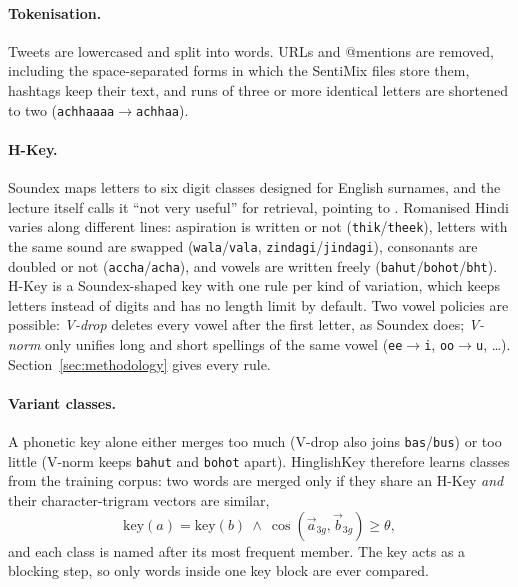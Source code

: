 \paragraph{Tokenisation.} Tweets are lowercased and split into words. URLs and @mentions are
removed, including the space-separated forms in which the SentiMix files store them, hashtags keep
their text, and runs of three or more identical letters are shortened to two
(\texttt{achhaaaa}$\to$\texttt{achhaa}).

\paragraph{H-Key.} Soundex \citep[Section~3.4]{manning2008iir} maps letters to six digit classes
designed for English surnames, and the lecture itself calls it ``not very useful'' for retrieval,
pointing to \citet{zobel1996phonetic}. Romanised Hindi varies along different lines: aspiration is
written or not (\texttt{thik}/\texttt{theek}), letters with the same sound are swapped
(\texttt{wala}/\texttt{vala}, \texttt{zindagi}/\texttt{jindagi}), consonants are doubled or not
(\texttt{accha}/\texttt{acha}), and vowels are written freely (\texttt{bahut}/\texttt{bohot}/\texttt{bht}).
H-Key is a Soundex-shaped key with one rule per kind of variation, which keeps letters instead of
digits and has no length limit by default. Two vowel policies are possible: \emph{V-drop} deletes
every vowel after the first letter, as Soundex does; \emph{V-norm} only unifies long and short
spellings of the same vowel (\texttt{ee}$\to$\texttt{i}, \texttt{oo}$\to$\texttt{u}, \ldots).
Section~\ref{sec:methodology} gives every rule.

\paragraph{Variant classes.} A phonetic key alone either merges too much (V-drop also joins
\texttt{bas}/\texttt{bus}) or too little (V-norm keeps \texttt{bahut} and \texttt{bohot} apart).
HinglishKey therefore learns classes from the training corpus: two words are merged only if they
share an H-Key \emph{and} their character-trigram vectors are similar,
\begin{equation}
\mathrm{key}(a)=\mathrm{key}(b)\ \wedge\ \cos(\vec a_{3g},\vec b_{3g})\ge\theta,
\label{eq:merge}
\end{equation}
and each class is named after its most frequent member. The key acts as a blocking step, so only
words inside one key block are ever compared.

